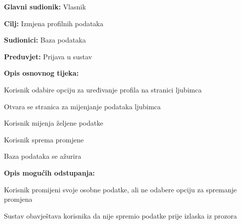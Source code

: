 				\noindent {}
				\begin{packed_item}
					
					\item \textbf{Glavni sudionik: } Vlasnik
					\item  \textbf{Cilj:} Izmjena profilnih podataka
					\item  \textbf{Sudionici:} Baza podataka
					\item  \textbf{Preduvjet:} Prijava u sustav
					\item  \textbf{Opis osnovnog tijeka:}
					
					\item[] \begin{packed_enum}
						
						\item Korisnik odabire opciju za uređivanje profila na stranici ljubimca
						\item Otvara se stranica za mijenjanje podataka ljubimca
						\item Korisnik mijenja željene podatke
						\item Korisnik sprema promjene
						\item Baza podataka se ažurira
					\end{packed_enum}
					
					\item  \textbf{Opis mogućih odstupanja:}
					
					\item[] \begin{packed_item}
						
						\item[3.a] Korisnik promijeni svoje osobne podatke, ali ne odabere opciju za spremanje promjena
						\item[] \begin{packed_enum}
							
							\item Sustav obavještava korisnika da nije spremio podatke prije izlaska iz prozora							
							
						\end{packed_enum}						
					\end{packed_item}
				\end{packed_item}
				

